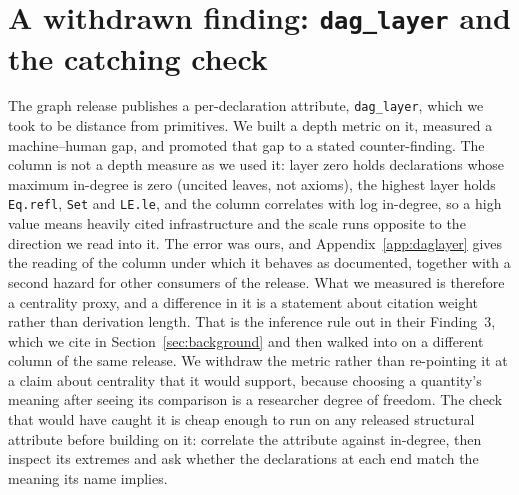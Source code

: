 
\section{A withdrawn finding: \texttt{dag\_layer} and the catching check}
\label{sec:dag-layer}

The graph release publishes a per-declaration attribute, \texttt{dag\_layer},
which we took to be distance from primitives. We built a depth metric on it,
measured a machine--human gap, and promoted that gap to a stated
counter-finding. The column is not a depth measure as we used it: layer zero
holds \layerZeroNodes{} declarations whose maximum in-degree is zero (uncited
leaves, not axioms), the highest layer holds \texttt{Eq.refl}, \texttt{Set}
and \texttt{LE.le}, and the column correlates \layerCorrLogIndegree{} with log
in-degree, so a high value means heavily cited infrastructure and the scale runs
opposite to the direction we read into it. The error was ours, and
Appendix~\ref{app:daglayer} gives the reading of the column under which it
behaves as documented, together with a second hazard for other consumers of the
release. What we measured is therefore a centrality proxy, and a
difference in it is a statement about citation weight rather than derivation
length. That is the inference \citet{li2026network} rule out in their
Finding~3, which we cite in Section~\ref{sec:background} and then walked into
on a different column of the same release. We withdraw the metric rather than
re-pointing it at a claim about centrality that it would support, because
choosing a quantity's meaning after seeing its comparison is a researcher
degree of freedom. The check that would have caught it is cheap enough to run
on any released structural attribute before building on it: correlate the
attribute against in-degree, then inspect its extremes and ask whether the
declarations at each end match the meaning its name implies.
